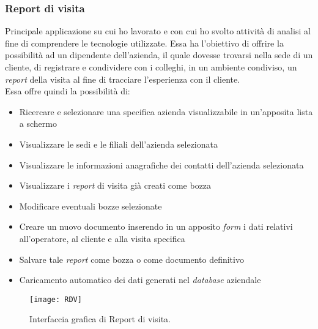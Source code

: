 \subsubsection*{Report di visita}
Principale applicazione su cui ho lavorato e con cui ho svolto attività di analisi al fine di comprendere le tecnologie utilizzate. Essa ha l'obiettivo di offrire la possibilità ad un dipendente dell'azienda, il quale dovesse trovarsi nella sede di un cliente, di registrare e condividere con i colleghi, in un ambiente condiviso, un \emph{report} della visita al fine di tracciare l'esperienza con il cliente.\\
Essa offre quindi la possibilità di: 
\begin{itemize}
    \item Ricercare e selezionare una specifica azienda visualizzabile in un'apposita lista a schermo 
    \item Visualizzare le sedi e le filiali dell'azienda selezionata 
    \item Visualizzare le informazioni anagrafiche dei contatti dell'azienda selezionata  
    \item Visualizzare i \emph{report} di visita già creati come bozza  
    \item Modificare eventuali bozze selezionate 
    \item Creare un nuovo documento inserendo in un apposito \emph{form} i dati relativi all'operatore, al cliente e alla visita specifica 
    \item Salvare tale \emph{report} come bozza o come documento definitivo
    \item Caricamento automatico dei dati generati nel \emph{database} aziendale 
\end{itemize}
\begin{figure}[htbp] 
    \centering 
    \texttt{[image: RDV]} 
    \caption{Interfaccia grafica di Report di visita.}
    \label{fig:RDV}
\end{figure}

